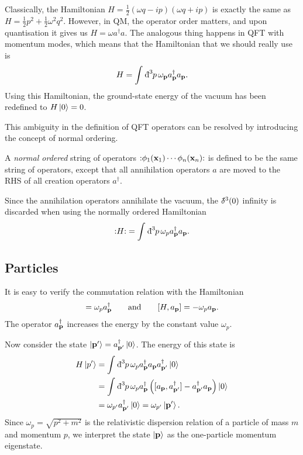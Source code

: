 Classically, the Hamiltonian $H = \frac{1}{2}(\omega q - i p)(\omega q + ip)$ is exactly the same as $H = \frac{1}{2}p^2 + \frac{1}{2} \omega^2 q^2$.
However, in QM, the operator order matters, and upon quantisation it gives us $H = \omega a^{\dagger} a$.
The analogous thing happens in QFT with momentum modes, which means that the Hamiltonian that we should really use is
\begin{equation}
  H = \int_{}^{} \bdd[3]{p} \omega_{\vb{p}} a^{\dagger}_{\vb{p}} a_{\vb{p}}.
\end{equation}
Using this Hamiltonian, the ground-state energy of the vacuum has been redefined to $H \ket{0} = 0$.

This ambiguity in the definition of QFT operators can be resolved by introducing the concept of normal ordering.
\begin{definition}
  A \emph{normal ordered} string of operators $\normalorder{\phi_1(\vb{x}_1) \cdots \phi_n(\vb{x}_n)}$ is defined to be the same string of operators, except that all annihilation operators $a$ are moved to the RHS of all creation operators $a^{\dagger}$.
\end{definition}
Since the annihilation operators annihilate the vacuum, the $\bdelta^3(0)$ infinity is discarded when using the normally ordered Hamiltonian
\begin{equation}
  \normalorder{H} = \int_{}^{} \bdd[3]{p} \omega_p a^{\dagger}_{\vb{p}} a_{\vb{p}}.
\end{equation}

\subsection{Particles}%
\label{sub:particles}

It is easy to verify the commutation relation with the Hamiltonian
\begin{equation}
  [H, a_{\vb{p}}^{\dagger}] = \omega_p a_{\vb{p}}^{\dagger} \qquad \text{and} \qquad 
  [H, a_{\vb{p}}] = -\omega_p a_{\vb{p}}.
\end{equation}
The operator $a_{\vb{p}}^{\dagger}$ increases the energy by the constant value $\omega_p$.

Now consider the state $\ket{\vb{p}'} = a_{\vb{p}'}^{\dagger} \ket{0}$. The energy of this state is
\begin{align}
  H \ket{p'} &= \int_{}^{} \bdd[3]{p} \omega_p a_{\vb{p}}^{\dagger} a_{\vb{p}} a_{\vb{p}'}^{\dagger} \ket{0}\\
  &= \int_{}^{} \bdd[3]{p} \omega_p a_{\vb{p}}^{\dagger} \left( [a_{\vb{p}}, a_{\vb{p}'}^{\dagger}] - a_{\vb{p}'}^{\dagger} a_{\vb{p}} \right) \ket{0} \\
  &= \omega_{p'} a_{\vb{p}'}^{\dagger} \ket{0} = \omega_{p'} \ket{\vb{p}'}.
\end{align}
Since $\omega_p = \sqrt{p^2 + m^2}$ is the relativistic dispersion relation of a particle of mass $m$ and momentum $p$, we interpret the state  $\ket{\vb{p}}$ as the one-particle momentum eigenstate.

